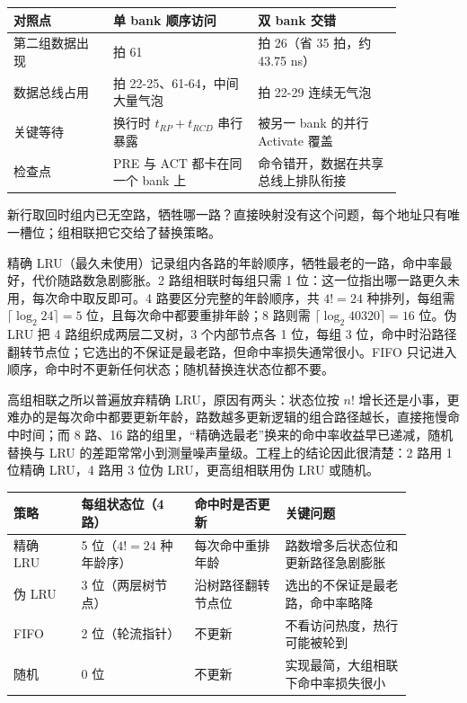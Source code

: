 \begin{longtable}{L{0.22\linewidth}L{0.32\linewidth}L{0.32\linewidth}}
\toprule
对照点 & 单 bank 顺序访问 & 双 bank 交错 \\
\midrule
第二组数据出现 & 拍 61 & 拍 26（省 35 拍，约 43.75 ns） \\\tablerowrule
数据总线占用 & 拍 22-25、61-64，中间大量气泡 & 拍 22-29 连续无气泡 \\\tablerowrule
关键等待 & 换行时 $t_{RP}+t_{RCD}$ 串行暴露 & 被另一 bank 的并行 Activate 覆盖 \\\tablerowrule
检查点 & PRE 与 ACT 都卡在同一个 bank 上 & 命令错开，数据在共享总线上排队衔接 \\
\bottomrule
\end{longtable}

新行取回时组内已无空路，牺牲哪一路？直接映射没有这个问题，每个地址只有唯一槽位；组相联把它交给了替换策略。

精确 LRU（最久未使用）记录组内各路的年龄顺序，牺牲最老的一路，命中率最好，代价随路数急剧膨胀。2 路组相联时每组只需 1 位：这一位指出哪一路更久未用，每次命中取反即可。4 路要区分完整的年龄顺序，共 $4!=24$ 种排列，每组需 $\lceil\log_2 24\rceil=5$ 位，且每次命中都要重排年龄；8 路则需 $\lceil\log_2 40320\rceil=16$ 位。伪 LRU 把 4 路组织成两层二叉树，3 个内部节点各 1 位，每组 3 位，命中时沿路径翻转节点位；它选出的不保证是最老路，但命中率损失通常很小。FIFO 只记进入顺序，命中时不更新任何状态；随机替换连状态位都不要。

高组相联之所以普遍放弃精确 LRU，原因有两头：状态位按 $n!$ 增长还是小事，更难办的是每次命中都要更新年龄，路数越多更新逻辑的组合路径越长，直接拖慢命中时间；而 8 路、16 路的组里，“精确选最老”换来的命中率收益早已递减，随机替换与 LRU 的差距常常小到测量噪声量级。工程上的结论因此很清楚：2 路用 1 位精确 LRU，4 路用 3 位伪 LRU，更高组相联用伪 LRU 或随机。

\begin{longtable}{L{0.15\linewidth}L{0.25\linewidth}L{0.20\linewidth}L{0.28\linewidth}}
\toprule
策略 & 每组状态位（4 路） & 命中时是否更新 & 关键问题 \\
\midrule
精确 LRU & 5 位（$4!=24$ 种年龄序） & 每次命中重排年龄 & 路数增多后状态位和更新路径急剧膨胀 \\\tablerowrule
伪 LRU & 3 位（两层树节点） & 沿树路径翻转节点位 & 选出的不保证是最老路，命中率略降 \\\tablerowrule
FIFO & 2 位（轮流指针） & 不更新 & 不看访问热度，热行可能被轮到 \\\tablerowrule
随机 & 0 位 & 不更新 & 实现最简，大组相联下命中率损失很小 \\
\bottomrule
\end{longtable}

